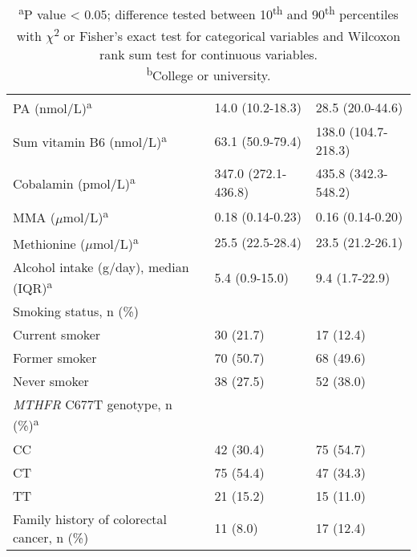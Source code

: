 \begin{center}
\begin{table}
\begin{adjustbox}{width=\textwidth}
\begin{tabular}{L{7.6cm}C{4.0cm}C{3.6cm}}
\quad PA (nmol/L)\textsuperscript{a} & 14.0 (10.2-18.3) & 28.5 (20.0-44.6)\\
\quad Sum vitamin B6 (nmol/L)\textsuperscript{a} & 63.1 (50.9-79.4) & 138.0 (104.7-218.3)\\
\quad Cobalamin (pmol/L)\textsuperscript{a} & 347.0 (272.1-436.8) & 435.8 (342.3-548.2)\\
\quad MMA ($\mu$mol/L)\textsuperscript{a} & 0.18 (0.14-0.23) & 0.16 (0.14-0.20)\\
\quad Methionine ($\mu$mol/L)\textsuperscript{a} & 25.5 (22.5-28.4) & 23.5 (21.2-26.1)\\
Alcohol intake (g/day), median (IQR)\textsuperscript{a} & 5.4 (0.9-15.0) & 9.4 (1.7-22.9)\\
Smoking status, n (\%) &~ &~\\
\quad Current smoker & 30 (21.7) & 17 (12.4)\\
\quad Former smoker & 70 (50.7) & 68 (49.6)\\
\quad Never smoker & 38 (27.5) & 52 (38.0)\\
{\textit{MTHFR} C677T genotype}, n (\%)\textsuperscript{a} &~ &~\\
\quad CC & 42 (30.4) & 75 (54.7)\\ \quad CT & 75 (54.4) & 47 (34.3)\\ \quad TT & 21 (15.2) & 15 (11.0)\\
Family history of colorectal cancer, n (\%) & 11 (8.0) & 17 (12.4)\\
\hline
\end{tabular}
\end{adjustbox}
\caption*{\footnotesize{\textsuperscript{a}P value < 0.05; difference tested between 10\textsuperscript{th} and 90\textsuperscript{th} percentiles with $\chi$\textsuperscript{2} or Fisher's exact test for categorical variables and Wilcoxon rank sum test for continuous variables. \\ \textsuperscript{b}College or university.}}
\end{table}
\end{center}


